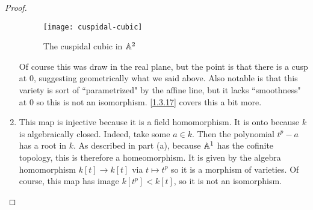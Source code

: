 \begin{proof}
\begin{enumerate}[label = (\alph*)]
        \begin{figure}[h]
            \centering
            \texttt{[image: cuspidal-cubic]}
            \caption{The cuspidal cubic in $\mathbb A^2$}
            \label{fig1.3.1}
        \end{figure}

        Of course this was draw in the real plane, but the point is that there is a cusp at 0, suggesting geometrically what we said above. Also notable is that this variety is sort of ``parametrized" by the affine line, but it lacks ``smoothness" at 0 so this is not an isomorphism. \ref{1.3.17} covers this a bit more.

        \item This map is injective because it is a field homomorphism. It is onto because $k$ is algebraically closed. Indeed, take some $a \in k$. Then the polynomial $t^p - a$ has a root in $k$. As described in part (a), because $\mathbb A^1$ has the cofinite topology, this is therefore a homeomorphism. It is given by the algebra homomorphism $k[t] \longrightarrow k[t]$ via $t \mapsto t^p$ so it is a morphism of varieties. Of course, this map has image $k[t^p] < k[t]$, so it is not an isomorphism.
    \end{enumerate}
\end{proof}
